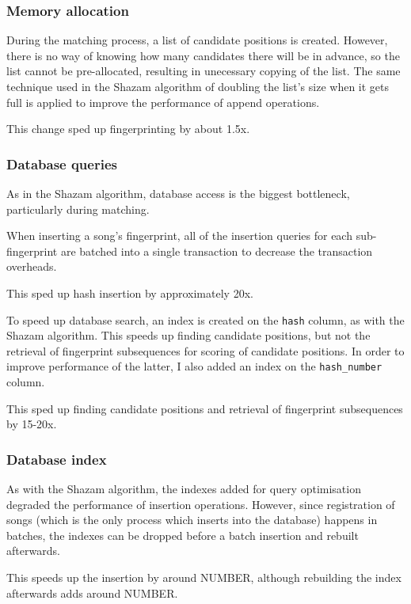 \documentclass[12pt,a4paper,twoside,openright]{report}
\begin{document}
\subsubsection{Memory allocation}

During the matching process, a list of candidate positions is created. However, there is no way of knowing how many candidates there will be in advance, so the list cannot be pre-allocated, resulting in unecessary copying of the list. The same technique used in the Shazam algorithm of doubling the list's size when it gets full is applied to improve the performance of append operations.

This change sped up fingerprinting by about 1.5x.

\subsubsection{Database queries}

As in the Shazam algorithm, database access is the biggest bottleneck, particularly during matching.

When inserting a song's fingerprint, all of the insertion queries for each sub-fingerprint are batched into a single transaction to decrease the transaction overheads.

This sped up hash insertion by approximately 20x.

To speed up database search, an index is created on the \lstinline{hash} column, as with the Shazam algorithm. This speeds up finding candidate positions, but not the retrieval of fingerprint subsequences for scoring of candidate positions. In order to improve performance of the latter, I also added an index on the \lstinline{hash_number} column.

This sped up finding candidate positions and retrieval of fingerprint subsequences by 15-20x.


\subsubsection{Database index}

As with the Shazam algorithm, the indexes added for query optimisation degraded the performance of insertion operations. However, since registration of songs (which is the only process which inserts into the database) happens in batches, the indexes can be dropped before a batch insertion and rebuilt afterwards.

This speeds up the insertion by around NUMBER, although rebuilding the index afterwards adds around NUMBER.
\end{document}
